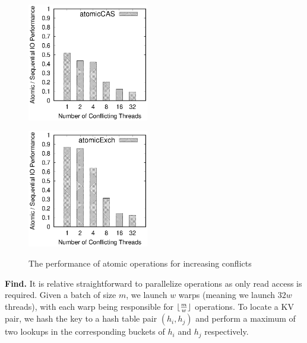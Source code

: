 \begin{figure}[t]
	\centering
	\hspace{-3em}
	\begin{minipage}{0.5\linewidth}
		\label{fig:atomicCAS}
		\includegraphics[width=5.3cm]{exp/atomic/atomicCAS.eps}
	\end{minipage}
	\hspace{-1em}
	\begin{minipage}{0.5\linewidth}
		\label{fig:atomicExch}
		\includegraphics[width=5.3cm]{exp/atomic/atomicExch.eps}
	\end{minipage}
	\caption{The performance of atomic operations for increasing conflicts}
	\label{fig:atomic}
\end{figure}

\vspace{1mm}\noindent\textbf{Find.} It is relative straightforward to parallelize  operations as only read access is required. 
Given a batch of size $m$, we launch $w$ warps (meaning we launch $32w$ threads), with each warp being responsible for $\lfloor\frac{m}{w}\rfloor$  operations. To locate a KV pair, we hash the key to a hash table pair $(h_i,h_j)$ and perform a maximum of two lookups in the corresponding buckets of $h_i$ and $h_j$ respectively. 





